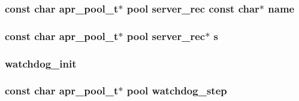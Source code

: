 \subsubsection[{\texorpdfstring{name}{name}}]{ const char {\bf apr\+\_\+pool\+\_\+t}$\ast$ {\bf pool} {\bf server\+\_\+rec} const char$\ast$ name}\hypertarget{group__MOD__WATCHDOG_ga5df88c26ff207fd6030c2a049ed4dae9}{}\label{group__MOD__WATCHDOG_ga5df88c26ff207fd6030c2a049ed4dae9}
\subsubsection[{\texorpdfstring{s}{s}}]{ const char {\bf apr\+\_\+pool\+\_\+t}$\ast$ {\bf pool} {\bf server\+\_\+rec}$\ast$ s}\hypertarget{group__MOD__WATCHDOG_ga6568b7b78d229d4c11b915b0570901c1}{}\label{group__MOD__WATCHDOG_ga6568b7b78d229d4c11b915b0570901c1}
\subsubsection[{\texorpdfstring{watchdog\+\_\+init}{watchdog_init}}]{\setlength{\rightskip}{0pt plus 5cm}watchdog\+\_\+init}\hypertarget{group__MOD__WATCHDOG_gaf233baa79c0d5c932fb358370d1b868d}{}\label{group__MOD__WATCHDOG_gaf233baa79c0d5c932fb358370d1b868d}
\subsubsection[{\texorpdfstring{watchdog\+\_\+step}{watchdog_step}}]{ const char {\bf apr\+\_\+pool\+\_\+t}$\ast$ {\bf pool} watchdog\+\_\+step}\hypertarget{group__MOD__WATCHDOG_gaaf25ef7424503ef501b0b1efa72f4fb5}{}\label{group__MOD__WATCHDOG_gaaf25ef7424503ef501b0b1efa72f4fb5}
